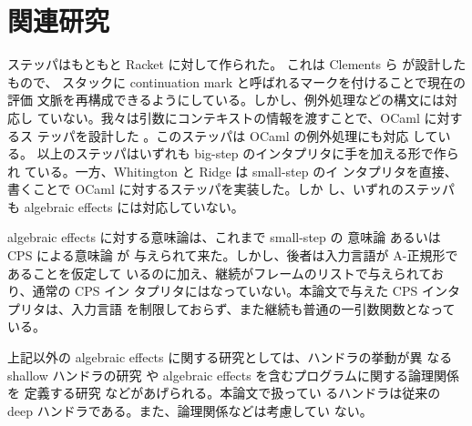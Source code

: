 \section{関連研究}
\label{section:related}

ステッパはもともと Racket に対して作られた。
これは Clements ら \cite{clements01} が設計したもので、
スタックに continuation mark と呼ばれるマークを付けることで現在の評価
文脈を再構成できるようにしている。しかし、例外処理などの構文には対応し
ていない。我々は引数にコンテキストの情報を渡すことで、OCaml に対するス
テッパを設計した \cite{FCA19}。このステッパは OCaml の例外処理にも対応
している。
以上のステッパはいずれも big-step のインタプリタに手を加える形で作られ
ている。一方、Whitington と Ridge \cite{EPTCS294.3} は small-step のイ
ンタプリタを直接、書くことで OCaml に対するステッパを実装した。しか
し、いずれのステッパも algebraic effects には対応していない。

algebraic effects に対する意味論は、これまで small-step の
意味論 \cite{10.1145/2500365.2500590}
あるいは CPS による意味論 \cite{e6cb0c3222794e48bf38cf44e46fe4aa} が
与えられて来た。しかし、後者は入力言語が A-正規形であることを仮定して
いるのに加え、継続がフレームのリストで与えられており、通常の CPS イン
タプリタにはなっていない。本論文で与えた CPS インタプリタは、入力言語
を制限しておらず、また継続も普通の一引数関数となっている。

上記以外の algebraic effects に関する研究としては、ハンドラの挙動が異
なる shallow ハンドラの研究 \cite{10.1007/978-3-030-02768-1_22} や
algebraic effects を含むプログラムに関する論理関係を
定義する研究 \cite{10.1145/3158096} などがあげられる。本論文で扱ってい
るハンドラは従来の deep ハンドラである。また、論理関係などは考慮してい
ない。

